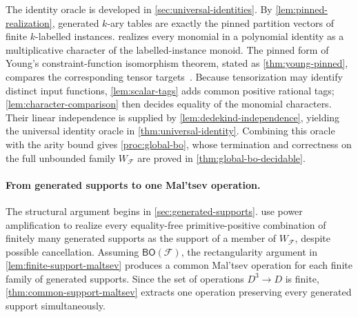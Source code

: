 \documentclass[11pt]{article}
\theoremstyle{plain}
\theoremstyle{definition}
\theoremstyle{remark}
\newcommand{\cF}{\mathcal F}
\newcommand{\BO}{\mathsf{BO}}
\begin{document}
The identity oracle is developed in \cref{sec:universal-identities}.
By \cref{lem:pinned-realization}, generated $k$-ary tables are exactly the
pinned partition vectors of finite $k$-labelled instances.
 realizes every monomial in a polynomial identity
as a multiplicative character of the labelled-instance monoid.  The pinned
form of Young's constraint-function isomorphism theorem, stated as
\cref{thm:young-pinned}, compares the corresponding tensor
targets~\cite[Corollary~35]{Young2025}.  Because
tensorization may identify distinct
input functions, \cref{lem:scalar-tags} adds common positive rational tags;
\cref{lem:character-comparison} then decides equality of the monomial
characters.  Their linear independence is supplied by
\cref{lem:dedekind-independence}, yielding the universal identity oracle in
\cref{thm:universal-identity}.  Combining this oracle with the arity bound
gives \cref{proc:global-bo}, whose termination and correctness on the full
unbounded family $W_{\cF}$ are proved in
\cref{thm:global-bo-decidable}.

\paragraph{From generated supports to one Mal'tsev operation.}
The structural argument begins in \cref{sec:generated-supports}.
use power amplification to realize every equality-free primitive-positive
combination of finitely many generated supports as the support of a
member of $W_{\cF}$, despite possible cancellation.  Assuming $\BO(\cF)$,
the rectangularity argument in \cref{lem:finite-support-maltsev} produces a
common Mal'tsev operation for each finite family of generated supports.
Since the set of operations $D^3\to D$ is finite,
\cref{thm:common-support-maltsev} extracts one operation preserving every
generated support simultaneously.
\end{document}
